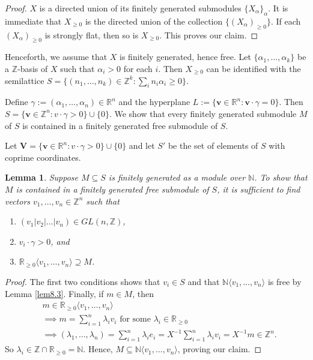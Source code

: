 \documentclass[notitlepage, 10pt]{article}
\theoremstyle{defin}
\theoremstyle{theo}
\newtheorem{lem}{Lemma}[defn]
\theoremstyle{rema}
\newcommand{\R}{\mathbb{R}}
\newcommand{\N}{\mathbb{N}}
\newcommand{\Z}{\mathbb{Z}}
\begin{document}
\begin{proof}
    $X$ is a directed union of its finitely generated submodules $\{X_\alpha\}_\alpha$. It is immediate that $X_{\geq 0}$ is the directed union of the collection $\{(X_{\alpha})_{\geq 0}\}$. If each $(X_\alpha)_{\geq 0}$ is strongly flat, then so is $X_{\geq 0}$. This proves our claim. 
\end{proof}

Henceforth, we assume that $X$ is finitely generated, hence free. Let $\{\alpha_1,\ldots, \alpha_k\}$ be a $\Z$-basis of $X$ such that $\alpha_i> 0$ for each $i$. Then $X_{\geq 0}$ can be identified with the semilattice 
    $S=\{(n_1,\ldots, n_k)\in \Z^k : \sum_i n_i\alpha_i\geq 0\}$. 
    
Define $\gamma := (\alpha_1,\ldots,\alpha_n)\in \R^n$ and the hyperplane $L := \{\mathbf{v} \in \R^n : \mathbf{v}\cdot \gamma = 0\}$. Then $S = \{\mathbf{v} \in \Z^n : v\cdot \gamma >0\} \cup \{0\}$. We show that every finitely generated submodule $M$ of $S$ is contained in a finitely generated free submodule of $S$.

Let $\mathbf{V}=\{\mathbf{v} \in \R^n : v\cdot \gamma >0\} \cup \{0\}$ and let $S'$ be the set of elements of $S$ with coprime coordinates. 

\begin{lem}\label{lem8.2}
   Suppose $M\subseteq S$ is finitely generated as a module over $\N$. To show that $M$ is contained in a finitely generated free submodule of $S$, it is sufficient to find vectors $v_1,\ldots, v_n\in \Z^n$ such that
    \begin{enumerate}
        \item $(v_1|v_2|\ldots|v_n)\in GL(n,\Z)$,
        \item $v_i\cdot \gamma >0$, and
        \item $\R_{\geq 0}\langle v_1,\ldots,v_n\rangle \supseteq M$.
    \end{enumerate}
\end{lem}

\begin{proof}
    The first two conditions shows that $v_i \in S$ and that $\N\langle v_1,\ldots,v_n\rangle$ is free by Lemma \ref{lem8.3}. Finally, if $m\in M$, then 
    \begin{align*}
        &m\in \R_{\geq 0}\langle v_1,\ldots,v_n\rangle \\
        &\implies  m = \sum_{i=1}^{n} \lambda_i v_i \text{ for some }\lambda_i\in \R_{\geq 0} \\
        &\implies (\lambda_1,\ldots,\lambda_n) =\sum_{i=1}^{n} \lambda_ie_i = X^{-1}\sum_{i=1}^{n} \lambda_iv_i = X^{-1}m \in \Z^n.
    \end{align*}
So $\lambda_i\in \Z\cap \R_{\geq 0} = \N$. Hence, $M\subseteq \N\langle v_1,\ldots,v_n\rangle$, proving our claim. 
\end{proof}
\end{document}
